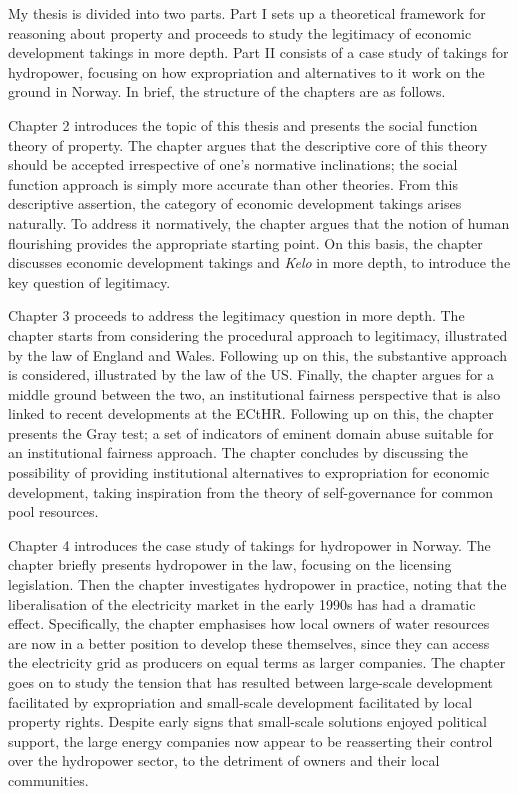 My thesis is divided into two parts. Part I sets up a theoretical framework for reasoning about property and proceeds to study the legitimacy of economic development takings in more depth. Part II consists of a case study of takings for hydropower, focusing on how expropriation and alternatives to it work on the ground in Norway. In brief, the structure of the chapters are as follows.

Chapter 2 introduces the topic of this thesis and presents the social function theory of property. The chapter argues that the descriptive core of this theory should be accepted irrespective of one's normative inclinations; the social function approach is simply more accurate than other theories. From this descriptive assertion, the category of economic development takings arises naturally. To address it normatively, the chapter argues that the notion of human flourishing provides the appropriate starting point. On this basis, the chapter discusses economic development takings and {\it Kelo} in more depth, to introduce the key question of legitimacy.

Chapter 3 proceeds to address the legitimacy question in more depth. The chapter starts from considering the procedural approach to legitimacy, illustrated by the law of England and Wales. Following up on this, the substantive approach is considered, illustrated by the law of the US. Finally, the chapter argues for a middle ground between the two, an institutional fairness perspective that is also linked to recent developments at the ECtHR. Following up on this, the chapter presents the Gray test; a set of indicators of eminent domain abuse suitable for an institutional fairness approach. The chapter concludes by discussing the possibility of providing institutional alternatives to expropriation for economic development, taking inspiration from the theory of self-governance for common pool resources.

Chapter 4 introduces the case study of takings for hydropower in Norway. The chapter briefly presents hydropower in the law, focusing on the licensing legislation. Then the chapter investigates hydropower in practice, noting that the liberalisation of the electricity market in the early 1990s has had a dramatic effect. Specifically, the chapter emphasises how local owners of water resources are now in a better position to develop these themselves, since they can access the electricity grid as producers on equal terms as larger companies. The chapter goes on to study the tension that has resulted between large-scale development facilitated by expropriation and small-scale development facilitated by local property rights. Despite early signs that small-scale solutions enjoyed political support, the large energy companies now appear to be reasserting their control over the hydropower sector, to the detriment of owners and their local communities.

